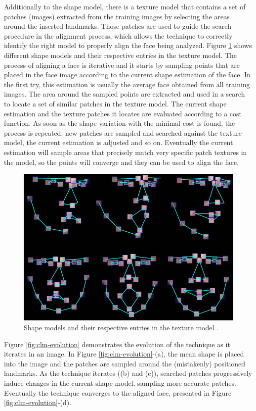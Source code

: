 Additionally to the shape model, there is a texture model that contains a set of patches (images) extracted from the training images by selecting the areas around the inserted landmarks. Those patches are used to guide the search procedure in the alignment process, which allows the technique to correctly identify the right model to properly align the face being analyzed. Figure \ref{fig:clm-patches} shows different shape models and their respective entries in the texture model. The process of aligning a face is iterative and it starts by sampling points that are placed in the face image according to the current shape estimation of the face. In the first try, this estimation is usually the average face obtained from all training images. The area around the sampled points are extracted and used in a search to locate a set of similar patches in the texture model. The current shape estimation and the texture patches it locates are evaluated according to a cost function. As soon as the shape variation with the minimal cost is found, the process is repeated: new patches are sampled and searched against the texture model, the current estimation is adjusted and so on. Eventually the current estimation will sample areas that precisely match very specific patch textures in the model, so the points will converge and they can be used to align the face.

\begin{figure}[ht]
    \centering
    \includegraphics[width=0.6\linewidth]{figures/clm-patches.jpg}
    \caption{Shape models and their respective entries in the texture model \parencite{yu2010facial}.}
    \label{fig:clm-patches}
\end{figure}

Figure \ref{fig:clm-evolution} demonstrates the evolution of the technique as it iterates in an image. In Figure \ref{fig:clm-evolution}-(a), the mean shape is placed into the image and the patches are sampled around the (mistakenly) positioned landmarks. As the technique iterates ((b) and (c)), searched patches progressively induce changes in the current shape model, sampling more accurate patches. Eventually the technique converges to the aligned face, presented in Figure \ref{fig:clm-evolution}-(d).

